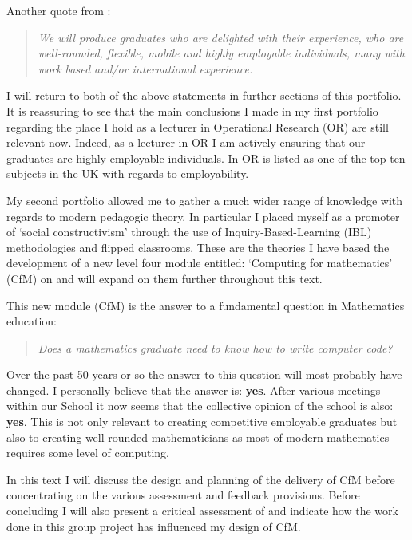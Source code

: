 \documentclass{article}
\begin{document}
Another quote from \cite{cardiff_university_way_2013}:

\begin{quotation}
\textit{We will produce graduates who are delighted with their experience, who are well-rounded, flexible, mobile and highly employable individuals, many with work based and/or international experience.}
\end{quotation}

I will return to both of the above statements in further sections of this portfolio. It is reassuring to see that the main conclusions I made in my first portfolio regarding the place I hold as a lecturer in Operational Research (OR) are still relevant now. Indeed, as a lecturer in OR I am actively ensuring that our graduates are highly employable individuals. In \cite{telegraph_graduate_2013} OR is listed as one of the top ten subjects in the UK with regards to employability.

My second portfolio allowed me to gather a much wider range of knowledge with regards to modern pedagogic theory. In particular I placed myself as a promoter of `social constructivism' \cite{jordan_approaches_2008} through the use of Inquiry-Based-Learning (IBL) methodologies \cite{mahavier_quick-start_2006} and flipped classrooms. These are the theories I have based the development of a new level four module entitled: `Computing for mathematics' (CfM) on and will expand on them further throughout this text.

This new module (CfM) is the answer to a fundamental question in Mathematics education:

\begin{quotation}
\textit{Does a mathematics graduate need to know how to write computer code?}
\end{quotation}

Over the past 50 years or so the answer to this question will most probably have changed. I personally believe that the answer is: \textbf{yes}. After various meetings within our School it now seems that the collective opinion of the school is also: \textbf{yes}. This is not only relevant to creating competitive employable graduates but also to creating well rounded mathematicians as most of modern mathematics requires some level of computing.

In this text I will discuss the design and planning of the delivery of CfM before concentrating on the various assessment and feedback provisions. Before concluding I will also present a critical assessment of \cite{anderson_understanding_2013} and indicate how the work done in this group project has influenced my design of CfM.
\end{document}
